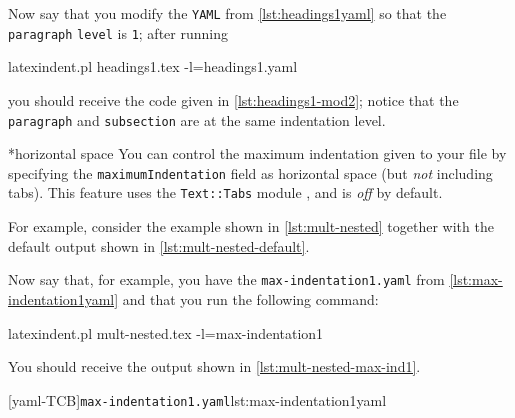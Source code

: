 	Now say that you modify the \texttt{YAML} from \cref{lst:headings1yaml} so that the \texttt{paragraph} \texttt{level} is \texttt{1}; after running \begin{commandshell}
latexindent.pl headings1.tex -l=headings1.yaml
\end{commandshell} you should receive the code given in \cref{lst:headings1-mod2}; notice that the \texttt{paragraph} and \texttt{subsection} are at the same indentation level.

*{horizontal space}
	You can control the maximum indentation given to your file by  specifying the \texttt{maximumIndentation} field as horizontal space (but \emph{not} including tabs).
	This feature uses the \texttt{Text::Tabs} module \cite{texttabs}, and is \emph{off} by default.

	For example, consider the example shown in \cref{lst:mult-nested} together with the default output shown in \cref{lst:mult-nested-default}.

	\begin{minipage}{.45\textwidth}
	\end{minipage}%
	\hfill
	\begin{minipage}{.45\textwidth}
	\end{minipage}

	Now say that, for example, you have the \texttt{max-indentation1.yaml} from \cref{lst:max-indentation1yaml} and that you run the following command: \begin{commandshell}
latexindent.pl mult-nested.tex -l=max-indentation1
    \end{commandshell} You should receive the output shown in \cref{lst:mult-nested-max-ind1}.

	\begin{minipage}{.45\textwidth}
		[yaml-TCB]{\texttt{max-indentation1.yaml}}{lst:max-indentation1yaml}
	\end{minipage}%
	\hfill
	\begin{minipage}{.45\textwidth}
	\end{minipage}

